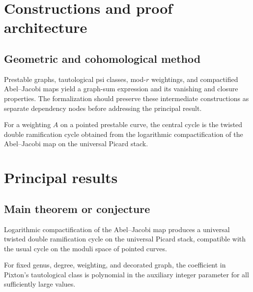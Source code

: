 \chapter{Constructions and proof architecture}
\label{chap:pixtons-formula-abel-jacobi-picard-stack-method}

\section{Geometric and cohomological method}
\label{sec:pixtons-formula-abel-jacobi-picard-stack-method}

Prestable graphs, tautological psi classes, mod-$r$ weightings, and compactified Abel--Jacobi maps yield a graph-sum expression and its vanishing and closure properties. The formalization should preserve these intermediate constructions
as separate dependency nodes before addressing the principal result.

\begin{definition}
\label{pixtons-formula-abel-jacobi-picard-stack-central-object}
For a weighting $A$ on a pointed prestable curve, the central cycle is the twisted double ramification cycle obtained from the logarithmic compactification of the Abel--Jacobi map on the universal Picard stack.
\notready
\end{definition}

\chapter{Principal results}
\label{chap:pixtons-formula-abel-jacobi-picard-stack-results}

\section{Main theorem or conjecture}
\label{sec:pixtons-formula-abel-jacobi-picard-stack-results}

\begin{theorem}
\label{pixtons-formula-abel-jacobi-picard-stack-main}
Logarithmic compactification of the Abel--Jacobi map produces a universal twisted double ramification cycle on the universal Picard stack, compatible with the usual cycle on the moduli space of pointed curves.
\notready
\end{theorem}

\begin{proposition}
\label{pixtons-formula-abel-jacobi-picard-stack-secondary}
For fixed genus, degree, weighting, and decorated graph, the coefficient in Pixton's tautological class is polynomial in the auxiliary integer parameter for all sufficiently large values.
\notready
\end{proposition}

